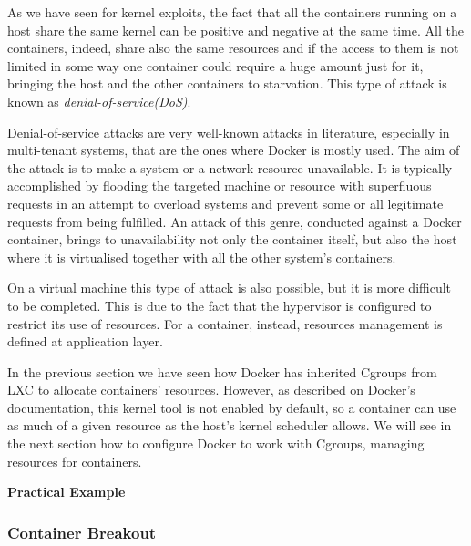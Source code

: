 \documentclass[a4paper,12pt]{article}
\begin{document}
As we have seen for kernel exploits, the fact that all the containers running on
a host share the same kernel can be positive and negative at the same time. All
the containers, indeed, share also the same resources and if the access to them
is not limited in some way one container could require a huge amount just for
it, bringing the host and the other containers to starvation. This type of
attack is known as \textit{denial-of-service(DoS)}.\par Denial-of-service
attacks are very well-known attacks in literature, especially in multi-tenant
systems, that are the ones where Docker is mostly used.  The aim of the attack
is to make a system or a network resource unavailable. It is typically
accomplished by flooding the targeted machine or resource with superfluous
requests in an attempt to overload systems and prevent some or all legitimate
requests from being fulfilled\cite{dos_wikipedia}. An attack of this genre,
conducted against a Docker container, brings to unavailability not only the
container itself, but also the host where it is virtualised together with all
the other system's containers.\par On a virtual machine this type of attack is
also possible, but it is more difficult to be completed. This is due to the fact
that the hypervisor is configured to restrict its use of resources. For a
container, instead, resources management is defined at application layer.\par
In the previous section we have seen how Docker has inherited Cgroups from LXC
to allocate containers' resources. However, as described on Docker's
documentation\cite{resource_on_docker}, this kernel tool is not enabled by
default, so a container can use as much of a given resource as the host's kernel
scheduler allows. We will see in the next section how to configure Docker to
work with Cgroups, managing resources for containers. 

\bigbreak\textbf{Practical Example}\bigbreak 

\subsubsection{Container Breakout}
\end{document}
